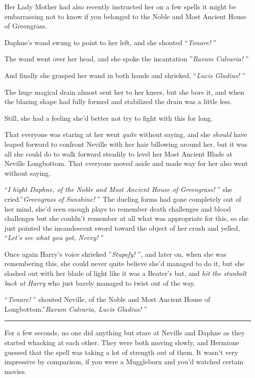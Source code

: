 Her Lady Mother had also recently instructed her on a few spells it
might be embarrassing not to know if you belonged to the Noble and Most
Ancient House of Greengrass.

Daphne's wand swung to point to her left, and she shouted
``\emph{Tonare!} ''

The wand went over her head, and she spoke the incantation ''\emph{Ravum
Calvaria!} ''

And finally she grasped her wand in both hands and shrieked,
``\emph{Lucis Gladius!} ''

The huge magical drain almost sent her to her knees, but she bore it,
and when the blazing shape had fully formed and stabilized the drain was
a little less.

Still, she had a feeling she'd better not try to fight with this for
long.

That everyone was staring at her went \emph{quite} without saying, and
she \emph{should} have leaped forward to confront Neville with her hair
billowing around her, but it was all she could do to walk forward
steadily to level her Most Ancient Blade at Neville Longbottom. That
everyone moved aside and made way for her also went without saying.

``\emph{I hight Daphne, of the Noble and Most Ancient House of
Greengrass!} '' she cried.''\emph{Greengrass of Sunshine!} '' The dueling
forms had gone completely out of her mind, she'd seen enough plays to
remember death challenges and blood challenges but she couldn't remember
at all what was appropriate for this, so she just pointed the
incandescent sword toward the object of her crush and yelled,
``\emph{Let's see what you got, Nevvy!} ''

Once again Harry's voice shrieked ''\emph{Stupefy!} '', and later on, when
she was remembering this, she could never quite believe she'd managed to
do it, but she slashed out with her blade of light like it was a
Beater's bat, and \emph{hit the stunbolt back at Harry} who just barely
managed to twist out of the way.

``\emph{Tonare!} '' shouted Neville, of the Noble and Most Ancient House
of Longbottom.''\emph{Ravum Calvaria, Lucis Gladius!} ''

\begin{center}\rule{3in}{0.4pt}\end{center}

For a few seconds, no one did anything but stare at Neville and Daphne
as they started whacking at each other. They were both moving slowly,
and Hermione guessed that the spell was taking a lot of strength out of
them. It wasn't very impressive by comparison, if you were a Muggleborn
and you'd watched certain movies.

